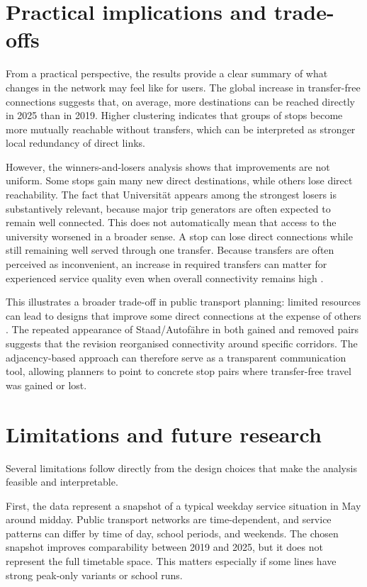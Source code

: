 \documentclass[12pt,a4paper,oneside]{report}
\begin{document}
\section{Practical implications and trade-offs}\label{sec:practical}

From a practical perspective, the results provide a clear summary of what changes in the network may feel like for users.
The global increase in transfer-free connections suggests that, on average, more destinations can be reached directly in 2025 than in 2019.
Higher clustering indicates that groups of stops become more mutually reachable without transfers, which can be interpreted as stronger local redundancy of direct links.

However, the winners-and-losers analysis shows that improvements are not uniform.
Some stops gain many new direct destinations, while others lose direct reachability.
The fact that Universit\"{a}t appears among the strongest losers is substantively relevant, because major trip generators are often expected to remain well connected.
This does not automatically mean that access to the university worsened in a broader sense.
A stop can lose direct connections while still remaining well served through one transfer.
Because transfers are often perceived as inconvenient, an increase in required transfers can matter for experienced service quality even when overall connectivity remains high \citep{iseki2009}.

This illustrates a broader trade-off in public transport planning: limited resources can lead to designs that improve some direct connections at the expense of others \citep{cipriani2019}.
The repeated appearance of Staad/Autof\"{a}hre in both gained and removed pairs suggests that the revision reorganised connectivity around specific corridors.
The adjacency-based approach can therefore serve as a transparent communication tool, allowing planners to point to concrete stop pairs where transfer-free travel was gained or lost.

\section{Limitations and future research}\label{sec:limitations}

Several limitations follow directly from the design choices that make the analysis feasible and interpretable.

First, the data represent a snapshot of a typical weekday service situation in May around midday.
Public transport networks are time-dependent, and service patterns can differ by time of day, school periods, and weekends.
The chosen snapshot improves comparability between 2019 and 2025, but it does not represent the full timetable space.
This matters especially if some lines have strong peak-only variants or school runs.
\end{document}
